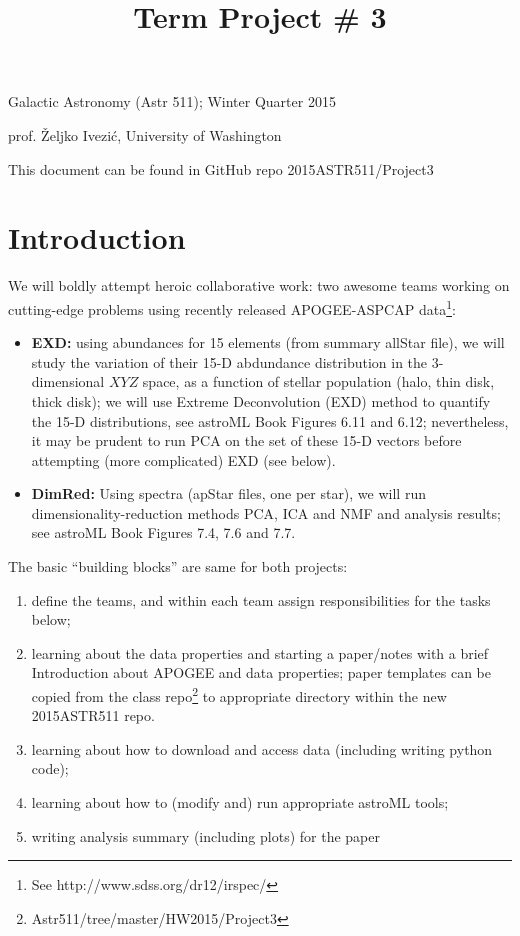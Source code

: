 \documentclass[12pt,preprint]{aastex}
\begin{document}
\title{ {\bf Term Project \# 3}}  
                   
Galactic Astronomy (Astr 511); Winter Quarter 2015

prof. \v{Z}eljko Ivezi\'{c}, University of Washington

This document can be found in GitHub repo 2015ASTR511/Project3

\section{Introduction} 

We will boldly attempt heroic collaborative work: two awesome teams working on
cutting-edge problems using recently released APOGEE-ASPCAP 
data\footnote{See http://www.sdss.org/dr12/irspec/}:
\begin{itemize} 
\item {\bf EXD:} using abundances for 15 elements (from summary allStar file), we will study the 
variation of their 15-D abdundance distribution in the 3-dimensional $XYZ$ space, as a function 
of stellar population (halo, thin disk, thick disk); we will use Extreme Deconvolution (EXD) method to 
quantify the 15-D distributions, see astroML Book Figures 6.11 and 6.12; nevertheless, it may be
prudent to run PCA on the set of these 15-D vectors before attempting (more complicated) EXD (see
below). 
\item {\bf DimRed:} Using spectra (apStar files, one per star), we will run dimensionality-reduction
methods PCA, ICA and NMF and analysis results; see astroML Book Figures 7.4, 7.6 and 7.7. 
\end{itemize}    

The basic ``building blocks'' are same for both projects: 
\begin{enumerate}
\item define the teams, and within each team assign responsibilities for the tasks below; 
\item learning about the data properties and starting a paper/notes with a brief Introduction 
about APOGEE and data properties;  paper templates can be copied from the class 
repo\footnote{Astr511/tree/master/HW2015/Project3} to  appropriate directory within the 
new 2015ASTR511 repo. 
\item learning about how to download and access data (including writing python code);  
\item learning about how to (modify and) run appropriate astroML tools; 
\item writing analysis summary (including plots) for the paper 
\end{enumerate}
\end{document}
